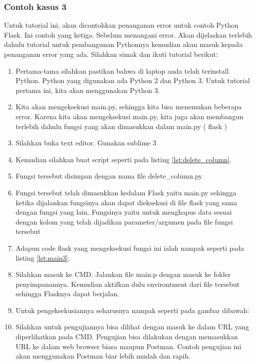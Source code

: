 \subsubsection{Contoh kasus 3}
Untuk tutorial ini, akan dicontohkan penanganan error untuk contoh Python Flask. Ini contoh yang ketiga. Sebelum menangani error. Akan dijelaskan terlebih dahulu tutorial untuk pembangunan Pythonnya kemudian akan masuk kepada penanganan error yang ada. Silahkan simak dan ikuti tutorial berikut:
\begin{enumerate}
\item Pertama-tama silahkan pastikan bahwa di laptop anda telah terinstall Python. Python yang digunakan ada Python 2 dan Python 3. Untuk tutorial pertama ini, kita akan menggunakan Python 3.
\item Kita akan mengeksekusi main.py, sehingga kita bisa menemukan beberapa error. Karena kita akan mengeksekusi main.py, kita juga akan membangun terlebih dahulu fungsi yang akan dimasukkan dalam main.py ( flask )
\item Silahkan buka text editor. Gunakan sublime 3
\item Kemudian silahkan buat script seperti pada listing \ref{lst:delete_column}.

\item Fungsi tersebut disimpan dengan nama file delete\_column.py
\item Fungsi tersebut telah dimasukkan kedalam Flask yaitu main.py sehingga ketika dijalankan fungsinya akan dapat dieksekusi di file flask yang sama dengan fungsi yang lain. Fungsinya yaitu untuk menghapus data sesuai dengan kolom yang telah dijadikan parameter/argumen pada file fungsi tersebut
\item Adapun code flask yang mengeksekusi fungsi ini ialah nampak seperti pada listing \ref{lst:main3}.

\item Silahkan masuk ke CMD. Jalankan file main.p dengan masuk ke folder penyimpanannya. Kemudian aktifkan dulu environtment dari file tersebut sehingga Flasknya dapat berjalan.
\item Untuk pengeksekusiannya seharusnya nampak seperti pada gambar dibawah: 
\item Silahkan untuk pengujiannya bisa dilihat dengan masuk ke dalam URL yang diperlihatkan pada CMD. Pengujian bisa dilakukan dengan memasukkan URL ke dalam web browser biasa maupun Postman. Contoh pengujian ini akan menggunakan Postman biar lebih mudah dan rapih.

\end{enumerate}
